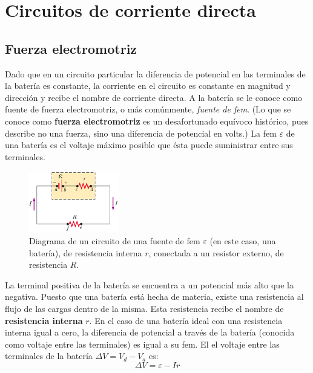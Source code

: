 \section{Circuitos de corriente directa}
  \subsection{Fuerza electromotriz}
    \PN Dado que en un circuito particular la diferencia de potencial en las terminales de la batería es constante, la
    corriente en el circuito es constante en magnitud y dirección y recibe el nombre de corriente directa. A la batería se
    le conoce como fuente de fuerza electromotriz, o más comúnmente, \textit{fuente de fem}. (Lo que se conoce como
    \textbf{fuerza electromotriz} es un desafortunado equívoco histórico, pues describe no una fuerza, sino una diferencia
    de potencial en volts.) La fem $\varepsilon$ de una batería es el voltaje máximo posible que ésta puede suministrar
    entre sus terminales.

    \begin{figure}[H]
    \centering
      \includegraphics[width=0.35\textwidth]{4/figure_10}
      \caption{Diagrama de un circuito de una fuente de fem $\varepsilon$ (en este caso, una batería), de resistencia
      interna $r$, conectada a un resistor externo, de resistencia $R$.}
    \end{figure}

    \PN La terminal positiva de la batería se encuentra a un potencial más alto que la negativa. Puesto que una batería
    está hecha de materia, existe una resistencia al flujo de las cargas dentro de la misma. Esta resistencia recibe el
    nombre de \textbf{resistencia interna} $r$. En el caso de una batería ideal con una resistencia interna igual a cero,
    la diferencia de potencial a través de la batería (conocida como voltaje entre las terminales) es igual a su fem. El
    el voltaje entre las terminales de la batería $\Delta V = V_{d} - V_{a}$ es:
    \begin{equation*}
      \Delta V = \varepsilon - I r
    \end{equation*}

